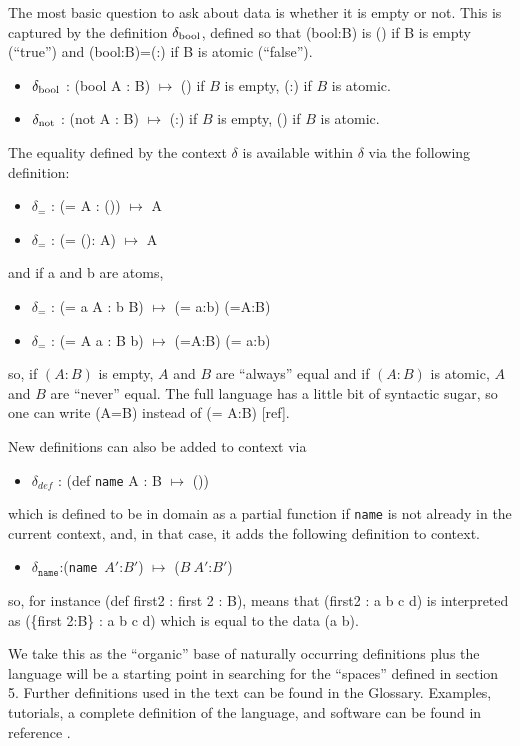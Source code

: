\documentclass[11pt]{article}
\begin{document}
    The most basic question to ask about data is whether it is empty or not.  This is captured by the definition $\delta_{\rm bool}$, defined 
so that (bool:B) is () if B is empty (``true'') and (bool:B)=(:) if B is atomic (``false'').
\begin{itemize}
\item {$\delta_{\rm bool}$ : ({\rm bool} A : B) $\mapsto$ () if $B$ is empty, (:) if $B$ is atomic.}
\item {$\delta_{\rm not}$ : ({\rm not} A : B) $\mapsto$ (:) if $B$ is empty, () if $B$ is atomic.} 
\end{itemize} 
The equality defined by the context $\delta$ is available within $\delta$ via the following definition:
\begin{itemize}
\item {$\delta_{=}$ : (= A : ()) $\mapsto$ A}
\item {$\delta_{=}$ : (= (): A) $\mapsto$ A}
\end{itemize}
and if a and b are atoms, 
\begin{itemize}
\item {$\delta_{=}$ : (= a A : b B) $\mapsto$ (= a:b) (=A:B)}
\item {$\delta_{=}$ : (= A a : B b) $\mapsto$ (=A:B) (= a:b)}
\end{itemize}
so, if $(A:B)$ is empty, $A$ and $B$ are ``always'' equal and if $(A:B)$ is atomic, $A$ and $B$ are ``never'' equal.  The full language has a little bit 
of syntactic sugar, so one can write (A=B) instead of (= A:B) [ref]. 

New definitions can also be added to context via  
\begin{itemize}
\item {$\delta_{def}$ : ({\rm def} \texttt{name} A : B} $\mapsto$ ())
\end{itemize}
which is defined to be in domain as a partial function if \texttt{name} is not already in the current context, and, in that case, it adds the following definition
to context.
\begin{itemize}
\item {$\delta_{\texttt{name}}$:(\texttt{name}\ $A'$:$B'$) $\mapsto$ ($B\ A'$:$B'$)}
\end{itemize}
so, for instance (def first2 : {first 2 : B}), means that (first2 : a b c d) is interpreted as (\{first 2:B\} : a b c d) which is equal to the data (a b).   

We take this as the ``organic'' base of naturally occurring 
definitions plus the language will be a starting point in searching for the ``spaces'' defined in section 5.  Further definitions used in the text can be found in 
the Glossary.  Examples, tutorials, a complete definition of the language, and software can be 
found in reference \cite{coda}. 
\end{document}
